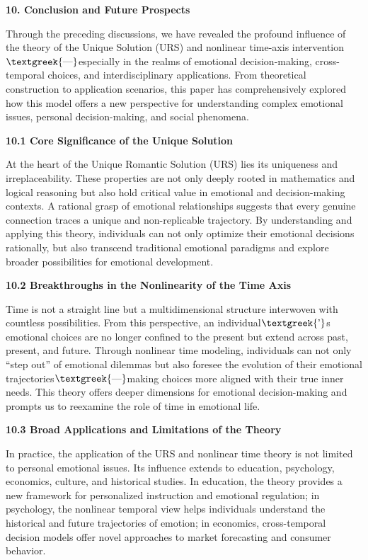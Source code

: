 \documentclass[a4paper]{article}
\begin{document}
{\centering\color[HTML]{595959}
\textbf{10. Conclusion and Future Prospects}
\par}

Through the preceding discussions, we have revealed the profound influence of the theory of the Unique Solution (URS)
and nonlinear time-axis intervention$\text{\textgreek{—}}$especially in the realms of emotional decision-making,
cross-temporal choices, and interdisciplinary applications. From theoretical construction to application scenarios,
this paper has comprehensively explored how this model offers a new perspective for understanding complex emotional
issues, personal decision-making, and social phenomena.

\textbf{10.1 Core Significance of the Unique Solution}

At the heart of the Unique Romantic Solution (URS) lies its uniqueness and irreplaceability. These properties are not
only deeply rooted in mathematics and logical reasoning but also hold critical value in emotional and decision-making
contexts. A rational grasp of emotional relationships suggests that every genuine connection traces a unique and
non-replicable trajectory. By understanding and applying this theory, individuals can not only optimize their emotional
decisions rationally, but also transcend traditional emotional paradigms and explore broader possibilities for
emotional development.

\textbf{10.2 Breakthroughs in the Nonlinearity of the Time Axis}

Time is not a straight line but a multidimensional structure interwoven with countless possibilities. From this
perspective, an individual$\text{\textgreek{’}}$s emotional choices are no longer confined to the present but extend
across past, present, and future. Through nonlinear time modeling, individuals can not only “step out” of emotional
dilemmas but also foresee the evolution of their emotional trajectories$\text{\textgreek{—}}$making choices more
aligned with their true inner needs. This theory offers deeper dimensions for emotional decision-making and prompts us
to reexamine the role of time in emotional life.

\textbf{10.3 Broad Applications and Limitations of the Theory}

In practice, the application of the URS and nonlinear time theory is not limited to personal emotional issues. Its
influence extends to education, psychology, economics, culture, and historical studies. In education, the theory
provides a new framework for personalized instruction and emotional regulation; in psychology, the nonlinear temporal
view helps individuals understand the historical and future trajectories of emotion; in economics, cross-temporal
decision models offer novel approaches to market forecasting and consumer behavior.
\end{document}
